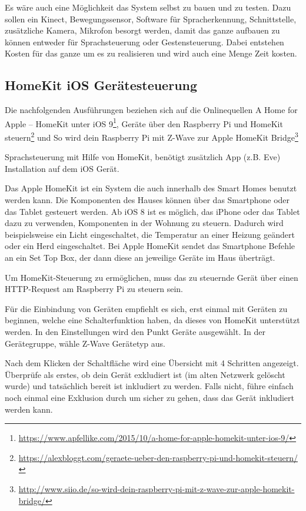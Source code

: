 Es wäre auch eine Möglichkeit das System selbst zu bauen und zu testen. Dazu sollen ein Kinect,
Bewegungssensor, Software für Spracherkennung, Schnittstelle, zusätzliche Kamera, Mikrofon
besorgt werden, damit das ganze aufbauen zu können entweder für Sprachsteuerung oder Gestensteuerung. Dabei entstehen Kosten für das ganze um es zu realisieren und wird auch eine
Menge Zeit kosten.

\subsection{HomeKit iOS Gerätesteuerung}
Die nachfolgenden Ausführungen beziehen sich auf die Onlinequellen \glqq A Home for Apple – HomeKit unter iOS 9\grqq\footnote{\url{https://www.apfellike.com/2015/10/a-home-for-apple-homekit-unter-ios-9/}}, \glqq Geräte über den Raspberry Pi und HomeKit steuern\grqq\footnote{\url{https://alexbloggt.com/geraete-ueber-den-raspberry-pi-und-homekit-steuern/}} und \glqq So wird dein Raspberry Pi mit Z-Wave zur Apple HomeKit Bridge\grqq\footnote{\url{http://www.siio.de/so-wird-dein-raspberry-pi-mit-z-wave-zur-apple-homekit-bridge/}}

Sprachsteuerung mit Hilfe von HomeKit, benötigt zusätzlich App (z.B. Eve) Installation auf dem iOS Gerät.

Das Apple HomeKit ist ein System die auch innerhalb des Smart Homes benutzt werden kann. Die
Komponenten des Hauses können über das Smartphone oder das Tablet gesteuert werden. Ab iOS 8
ist es möglich, das iPhone oder das Tablet dazu zu verwenden, Komponenten in der Wohnung zu
steuern. Dadurch wird beispielsweise ein Licht eingeschaltet, die Temperatur an einer Heizung
geändert oder ein Herd eingeschaltet. Bei Apple HomeKit sendet das Smartphone Befehle an ein Set Top Box, der dann diese an jeweilige Geräte im Haus überträgt.

Um HomeKit-Steuerung zu ermöglichen, muss das zu steuernde Gerät über einen HTTP-Request am Raspberry Pi zu steuern sein.

Für die Einbindung von Geräten empfiehlt es sich, erst einmal mit Geräten zu beginnen, welche eine Schalterfunktion haben, da dieses von HomeKit unterstützt werden. In den Einstellungen wird den Punkt \glqq Geräte\grqq{} ausgewählt. In der Gerätegruppe, wähle Z-Wave Gerätetyp aus.

Nach dem Klicken der Schaltfläche wird eine Übersicht mit 4 Schritten angezeigt. Überprüfe als
erstes, ob dein Gerät exkludiert ist (im alten Netzwerk gelöscht wurde) und tatsächlich bereit ist inkludiert zu werden. Falls nicht, führe einfach noch einmal eine Exklusion durch um sicher zu gehen, dass das Gerät inkludiert werden kann.

